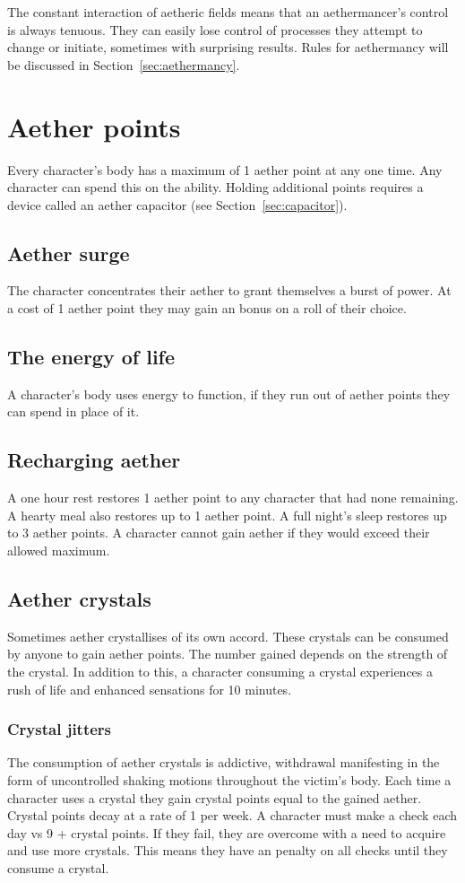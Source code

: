 \documentclass[a4paper,11pt,oneside]{book}
\newcommand{\textlf}[1]{\textbf{\titlecap{#1}}}
\begin{document}
The constant interaction of aetheric fields means that an aethermancer's control is always tenuous. They can easily lose control of processes they attempt to change or initiate, sometimes with surprising results. Rules for aethermancy will be discussed in Section~\ref{sec:aethermancy}.

\section{Aether points}
Every character's body has a maximum of 1 aether point at any one time. Any character can spend this on the \textlf{aether surge} ability. Holding additional points requires a device called an aether capacitor (see Section~\ref{sec:capacitor}).

\subsection{Aether surge}
The character concentrates their aether to grant themselves a burst of power. At a cost of 1 aether point they may gain an \textlf{edge} bonus on a roll of their choice.

\subsection{The energy of life}
A character's body uses energy to function, if they run out of aether points they can spend \textlf{endurance} in place of it.

\subsection{Recharging aether}
A one hour rest restores 1 aether point to any character that had none remaining. A hearty meal also restores up to 1 aether point. A full night's sleep restores up to 3 aether points. A character cannot gain aether if they would exceed their allowed maximum.

\subsection{Aether crystals}
Sometimes aether crystallises of its own accord. These crystals can be consumed by anyone to gain aether points. The number gained depends on the strength of the crystal. In addition to this, a character consuming a crystal experiences a rush of life and enhanced sensations for 10 minutes.
\subsubsection{Crystal jitters}
The consumption of aether crystals is addictive, withdrawal manifesting in the form of uncontrolled shaking motions throughout the victim's body. Each time a character uses a crystal they gain crystal points equal to the gained aether. Crystal points decay at a rate of 1 per week. A character must make a \textlf{resolve} check each day vs 9 + crystal points. If they fail, they are overcome with a need to acquire and use more crystals. This means they have an \textlf{edge} penalty on all checks until they consume a crystal.   
\end{document}
